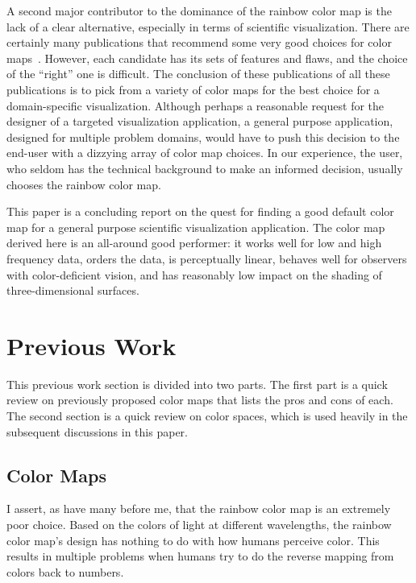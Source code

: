 \documentclass{vgtc}                          %
\newcommand{\lcite}[1]{~\cite{#1}}
\begin{document}
A second major contributor to the dominance of the rainbow color map is the
lack of a clear alternative, especially in terms of scientific
visualization.  There are certainly many publications that recommend some
very good choices for color maps\lcite{Levkowitz92,Rheingans99,Ware04,Brewer05}.
However, each candidate has its sets of features and flaws, and the choice of
the ``right'' one is difficult.  The conclusion of these publications of
all these publications is to pick from a variety of color maps for the best
choice for a domain-specific visualization.  Although perhaps a reasonable
request for the designer of a targeted visualization application, a general
purpose application, designed for multiple problem domains, would have to
push this decision to the end-user with a dizzying array of color map
choices.  In our experience, the user, who seldom has the technical
background to make an informed decision, usually chooses the rainbow color
map.

This paper is a concluding report on the quest for finding a good default
color map for a general purpose scientific visualization application.  The
color map derived here is an all-around good performer: it works well for
low and high frequency data, orders the data, is perceptually linear,
behaves well for observers with color-deficient vision, and has reasonably
low impact on the shading of three-dimensional surfaces.


\section{Previous Work}
\label{sec:PreviousWork}

This previous work section is divided into two parts.  The first part is a
quick review on previously proposed color maps that lists the pros and
cons of each.  The second section is a quick review on color spaces,
which is used heavily in the subsequent discussions in this paper.

\subsection{Color Maps}
\label{sec:PreviousWork:ColorMaps}

I assert, as have many before me, that the rainbow color map is an
extremely poor choice.  Based on the colors of light at different
wavelengths, the rainbow color map's design has nothing to do with how
humans perceive color.  This results in multiple problems when humans try
to do the reverse mapping from colors back to numbers.
\end{document}
